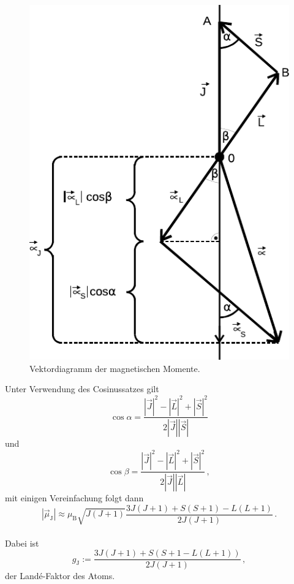 \begin{figure}[H]
    \centering
    \includegraphics{figures/Abb_1.pdf}
    \caption{Vektordiagramm der magnetischen Momente\cite{ap07}.}
    \label{fig:abb1}
\end{figure} 

Unter Verwendung des Cosinussatzes gilt
\begin{equation*}
    \cos\alpha = \dfrac{|\vec{J}|^2 - |\vec{L}|^2 + |\vec{S}|^2}{2|\vec{J}| |\vec{S}|}
\end{equation*}
und
\begin{equation*}
    \cos\beta = \dfrac{|\vec{J}|^2 - |\vec{L}|^2 + |\vec{S}|^2}{2|\vec{J}| |\vec{L}|} \,,
\end{equation*}
mit einigen Vereinfachung folgt dann
\begin{equation*}
    |\vec{\mu}_\text{J}| \approx \mu_\text{B} \sqrt{J(J + 1)} \dfrac{3 J (J + 1) + {S(S + 1) - L(L +1)}}{2J(J + 1)} \,.
\end{equation*} \\

Dabei ist 
\begin{equation}
    g_\text{J} := \dfrac{3 J(J + 1) + {S(S + 1 - L(L + 1))}}{2 J(J + 1)} \,,
    \label{eq:lande-faktor}
\end{equation}
der Landé-Faktor des Atoms. \\

